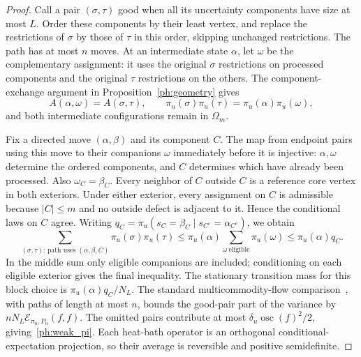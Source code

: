 \documentclass[11pt]{article}
\numberwithin{equation}{section}
\begin{document}
\begin{proof}
Call a pair $(\sigma,\tau)$ good when all its uncertainty components have size at most $L$. Order these components by their least vertex, and replace the restrictions of $\sigma$ by those of $\tau$ in this order, skipping unchanged restrictions. The path has at most $n$ moves. At an intermediate state $\alpha$, let $\omega$ be the complementary assignment: it uses the original $\sigma$ restrictions on processed components and the original $\tau$ restrictions on the others. The component-exchange argument in Proposition~\ref{ph:geometry} gives
\[
 A(\alpha,\omega)=A(\sigma,\tau),\qquad
 \pi_u(\sigma)\pi_u(\tau)=\pi_u(\alpha)\pi_u(\omega),
\]
and both intermediate configurations remain in $\Omega_m$.

Fix a directed move $(\alpha,\beta)$ and its component $C$. The map from endpoint pairs using this move to their companions $\omega$ immediately before it is injective: $\alpha,\omega$ determine the ordered components, and $C$ determines which have already been processed. Also $\omega_C=\beta_C$. Every neighbor of $C$ outside $C$ is a reference core vertex in both exteriors. Under either exterior, every assignment on $C$ is admissible because $|C|\le m$ and no outside defect is adjacent to it. Hence the conditional laws on $C$ agree. Writing
$q_C=\pi_u(s_C=\beta_C\mid s_{C^c}=\alpha_{C^c})$, we obtain
\[
 \sum_{(\sigma,\tau):\,\text{path uses }(\alpha,\beta,C)}
       \pi_u(\sigma)\pi_u(\tau)
 \le\pi_u(\alpha)\sum_{\omega\ \mathrm{eligible}}\pi_u(\omega)
 \le\pi_u(\alpha)q_C.
\]
In the middle sum only eligible companions are included; conditioning on each eligible exterior gives the final inequality. The stationary transition mass for this block choice is $\pi_u(\alpha)q_C/N_L$. The standard multicommodity-flow comparison~\cite{Sin92}, with paths of length at most $n$, bounds the good-pair part of the variance by $nN_L\mathcal E_{\pi_u,P_u}(f,f)$. The omitted pairs contribute at most $\delta_u\operatorname{osc}(f)^2/2$, giving~\eqref{ph:weak_pi}. Each heat-bath operator is an orthogonal conditional-expectation projection, so their average is reversible and positive semidefinite.
\end{proof}
\end{document}
